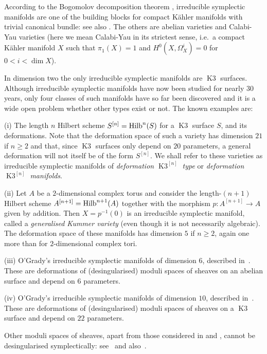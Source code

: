 \documentclass[a4paper,11pt]{article}
\newcommand{\Hilb}{\mathop{\null\mathrm {Hilb}}\nolimits}
\newcommand{\Kthree}{\mathop{\mathrm {K3}}\nolimits}
\begin{document}
According to the Bogomolov decomposition theorem \cite{Bog2},
irreducible symplectic manifolds are one of the building blocks for
compact K\"ahler manifolds with trivial canonical bundle: see also
\cite[Th\'eor\`eme 2]{Be}. The others are abelian varieties and
Calabi-Yau varieties (here we mean Calabi-Yau in its strictest sense,
i.e.\ a compact K\"ahler manifold $X$ such that $\pi_1(X)=1$ and
$H^0(X, \Omega^i_X)=0$ for $0<i<\dim X$).

In dimension two the only irreducible symplectic manifolds are
$\Kthree$ surfaces. Although irreducible symplectic manifolds have now
been studied for nearly $30$ years, only four classes of such
manifolds have so far been discovered and it is a wide open problem
whether other types exist or not.  The known examples are:

\rm{(i)} The length $n$ Hilbert scheme $S^{[n]}=\Hilb^n(S)$ for a
$\Kthree$ surface $S$, and its deformations.  Note that the
deformation space of such a variety has dimension $21$ if $n\ge 2$ and that, since
$\Kthree$ surfaces only depend on $20$ parameters, a general
deformation will not itself be of the form $S^{[n]}$. We shall refer
to these varieties as irreducible symplectic manifolds of
\emph{deformation $\Kthree^{[n]}$ type} or \emph{deformation
  $\Kthree^{[n]}$ manifolds}.

\rm{(ii)} Let $A$ be a $2$-dimensional complex torus and consider the
length-$(n+1)$ Hilbert scheme $A^{[n+1]}=\Hilb^{n+1}(A)$ together with
the morphism $p\colon A^{[n+1]} \to A$ given by addition. Then
$X=p^{-1}(0)$ is an irreducible symplectic manifold, called a
\emph{generalised Kummer variety} (even though it is not necessarily
algebraic).  The deformation space of these manifolds has dimension
$5$ if $n\ge 2$, again one more than for $2$-dimensional complex tori.

\rm{(iii)} O'Grady's irreducible symplectic manifolds of dimension
$6$, described in~\cite{OG2}. These are deformations of
(desingularised) moduli spaces of sheaves on an abelian surface and
depend on $6$ parameters.

\rm{(iv)} O'Grady's irreducible symplectic manifolds of dimension
$10$, described in~\cite{OG1}. These are deformations of
(desingularised) moduli spaces of sheaves on a $\Kthree$ surface and
depend on $22$ parameters.

Other moduli spaces of sheaves, apart from those considered in
\cite{OG1} and \cite{OG2}, cannot be desingularised symplectically:
see~\cite{KLS} and also~\cite{Zo}.
\end{document}
